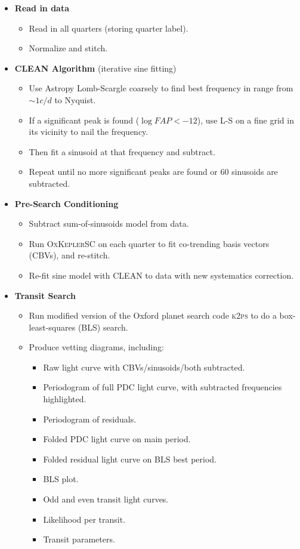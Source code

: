 \documentclass{aastex62}
\begin{document}
\begin{itemize}
	\item \textbf{Read in data}
	\begin{itemize}
		\item Read in all quarters (storing quarter label).
		\item Normalize and stitch.
	\end{itemize}
	\item \textbf{CLEAN Algorithm} (iterative sine fitting)
	\begin{itemize}
		\item Use Astropy \citep{astropy} Lomb-Scargle \citep{lomb,scargle,vanderplas} coarsely to find best frequency in range from $\sim 1 c/d$ to Nyquist.
		\item If a significant peak is found ($\log{FAP} < -12$), use L-S on a fine grid in its vicinity to nail the frequency.
		\item Then fit a sinusoid at that frequency and subtract. 
		\item Repeat until no more significant peaks are found or 60 sinusoids are subtracted.
	\end{itemize}
	\item \textbf{Pre-Search Conditioning}
	\begin{itemize}
		\item Subtract sum-of-sinusoids model from data.
		\item Run \textsc{OxKeplerSC} \citep{oxksc} on each quarter to fit co-trending basis vectors (CBVs), and re-stitch.
		\item Re-fit sine model with CLEAN to data with new systematics correction.
	\end{itemize}
	\item \textbf{Transit Search}
	\begin{itemize}
		\item Run modified version of the Oxford planet search code \textsc{k2ps} \citep{pope2016,k2ps} to do a box-least-squares (BLS) search. 
		\item Produce vetting diagrams, including:
		\begin{itemize}
			\item Raw light curve with CBVs/sinusoids/both subtracted.
			\item Periodogram of full PDC light curve, with subtracted frequencies highlighted.
			\item Periodogram of residuals.
			\item Folded PDC light curve on main period.
			\item Folded residual light curve on BLS best period.
			\item BLS plot.
			\item Odd and even transit light curves.
			\item Likelihood per transit.
			\item Transit parameters.
		\end{itemize}
	\end{itemize}
\end{itemize}
\end{document}
